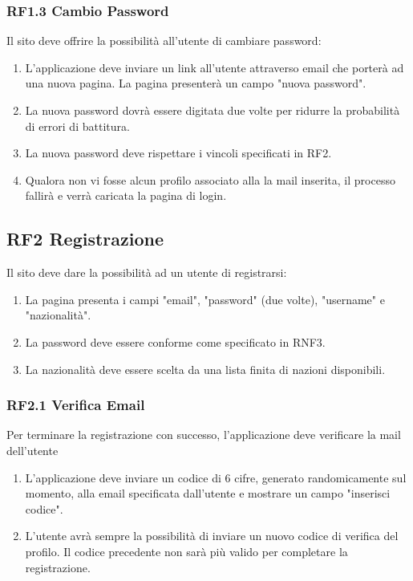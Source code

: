 \documentclass{report}
\begin{document}
\subsubsection*{RF1.3 Cambio Password}
Il sito deve offrire la possibilità all’utente di cambiare password:
	\begin{enumerate}
		\item L'applicazione deve inviare un link all'utente attraverso email che porterà ad una nuova pagina. La pagina presenterà un campo "nuova password".
		
		\item La nuova password dovrà essere digitata due volte per ridurre la probabilità di errori di battitura.
		
		\item La nuova password deve rispettare i vincoli specificati in RF2.
		
		\item Qualora non vi fosse alcun profilo associato alla la mail inserita, il processo fallirà e verrà caricata la pagina di login.
	\end{enumerate}


\subsection*{RF2 Registrazione}
Il sito deve dare la possibilità ad un utente di registrarsi:
\begin{enumerate}
	\item La pagina presenta i campi "email", "password" (due volte), "username" e "nazionalità". 
	\item La password deve essere conforme come specificato in RNF3.
	\item La nazionalità deve essere scelta da una lista finita di nazioni disponibili.
\end{enumerate}

\subsubsection*{RF2.1 Verifica Email}
Per terminare la registrazione con successo, l'applicazione deve verificare la mail dell'utente

\begin{enumerate}
	\item L'applicazione deve inviare un codice di 6 cifre, generato randomicamente sul momento, alla email specificata dall’utente e mostrare un campo "inserisci codice".
		
	\item L’utente avrà sempre la possibilità di inviare un nuovo codice di verifica del profilo. Il codice precedente non sarà più valido per completare la registrazione.
		
\end{enumerate}
\end{document}
